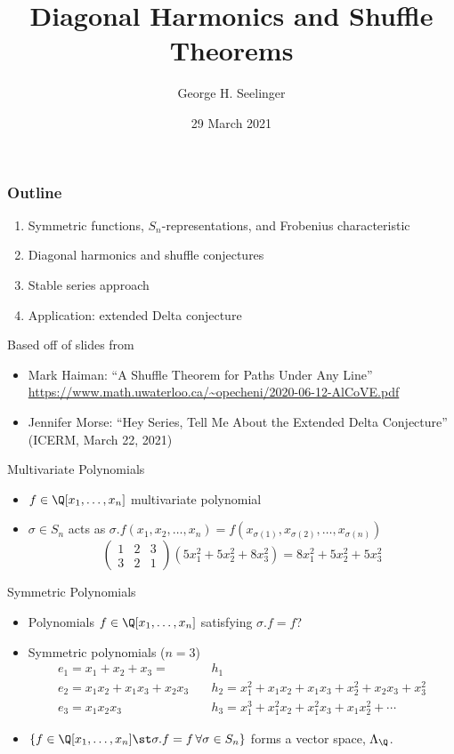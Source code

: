 \documentclass{beamer}
\title[Shuffle Theorems]{Diagonal Harmonics and Shuffle Theorems} %
\author[George H. Seelinger]{George H. Seelinger} %
\institute[UVA] %
{
  \medskip
\textit{ghs9ae@virginia.edu}\\ %
\medskip
  joint with Jonah Blasiak, Mark Haiman, Jennifer Morse, and Anna
  Pun\\
  \medskip
UVA Graduate Seminar %
}
\date{29 March 2021} %
\newcommand{\sym}{\Lambda}
\begin{document}
\begin{frame}
 \titlepage 
\end{frame}
\begin{frame}
  \frametitle{Outline}
  \begin{enumerate}
  \item Symmetric functions, \(S_n\)-representations, and Frobenius characteristic
  \item Diagonal harmonics and shuffle conjectures
  \item Stable series approach
  \item Application: extended Delta conjecture
  \end{enumerate}\pause
  Based off of slides from
  \begin{itemize}
  \item Mark Haiman: ``A Shuffle Theorem for Paths Under Any Line''\\
    \url{https://www.math.uwaterloo.ca/~opecheni/2020-06-12-AlCoVE.pdf}
  \item Jennifer Morse: ``Hey Series, Tell Me About the Extended Delta
    Conjecture'' (ICERM, March 22, 2021)
  \end{itemize}
\end{frame}
\begin{frame}{Multivariate Polynomials}
  \begin{itemize}
  \item \(f \in \Q[x_1,\ldots,x_n]\) multivariate polynomial \pause
  \item \(\sigma \in S_n\) acts as \(\sigma.f(x_1,x_2,\ldots,x_n) =
    f(x_{\sigma(1)}, x_{\sigma(2)},\ldots,x_{\sigma(n)})\)
    \[
      \left(
        \begin{matrix}
          1 & 2 & 3\\
          3 & 2 & 1
        \end{matrix}
      \right) (5x_1^2+5x_2^2+8x_3^2) = 8x_1^2+5x_2^2+5x_3^2
    \]
  \end{itemize}
\end{frame}
\begin{frame}{Symmetric Polynomials}
  \begin{itemize}
    \item Polynomials \(f \in \Q[x_1,\ldots,x_n]\) satisfying \(\sigma.f
    = f\)? \pause
  \item Symmetric polynomials (\(n=3\))
    \begin{align*}
      e_1 = x_1 + x_2 + x_3 = & h_1  \\
      e_2 = x_1 x_2 + x_1 x_3 + x_2 x_3 \quad & h_2 = x_1^2 + x_1 x_2 + x_1
                                          x_3 + x_2^2 +  x_2 x_3 +x_3^2  \\
      e_3 = x_1 x_2 x_3 \quad & h_3 = x_1^3 + x_1^2 x_2 + x_1^2 x_3 + x_1
                          x_2^2 + \cdots
    \end{align*} \pause
  \item \(\{f \in \Q[x_1,\ldots,x_n] \st \sigma.f = f \, \forall \sigma
    \in S_n\}\) forms a vector space, \(\sym_\Q\).
\end{itemize}
\end{frame}
\end{document}
